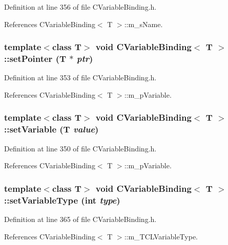 Definition at line 356 of file CVariable\-Binding.h.

References CVariable\-Binding$<$ T $>$::m\_\-s\-Name.
\subsubsection{\setlength{\rightskip}{0pt plus 5cm}template$<$class T$>$ void CVariable\-Binding$<$ T $>$::set\-Pointer (T $\ast$ {\em ptr})\hspace{0.3cm}{\tt  [inline]}}\label{classCVariableBinding_a8}




Definition at line 353 of file CVariable\-Binding.h.

References CVariable\-Binding$<$ T $>$::m\_\-p\-Variable.
\subsubsection{\setlength{\rightskip}{0pt plus 5cm}template$<$class T$>$ void CVariable\-Binding$<$ T $>$::set\-Variable (T {\em value})\hspace{0.3cm}{\tt  [inline]}}\label{classCVariableBinding_a7}




Definition at line 350 of file CVariable\-Binding.h.

References CVariable\-Binding$<$ T $>$::m\_\-p\-Variable.
\subsubsection{\setlength{\rightskip}{0pt plus 5cm}template$<$class T$>$ void CVariable\-Binding$<$ T $>$::set\-Variable\-Type (int {\em type})\hspace{0.3cm}{\tt  [inline]}}\label{classCVariableBinding_a12}




Definition at line 365 of file CVariable\-Binding.h.

References CVariable\-Binding$<$ T $>$::m\_\-TCLVariable\-Type.
